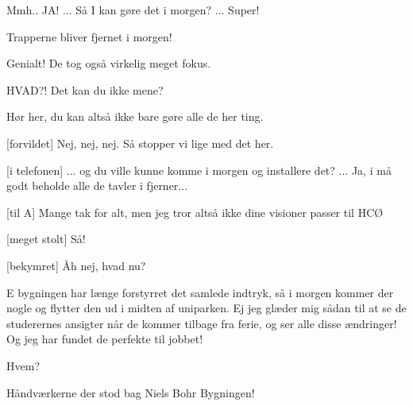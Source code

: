 \documentclass[a4paper,11pt]{article}
\begin{document}
\begin{sketch}

 Mmh.. JA! ... Så I kan gøre det i morgen? ... Super!


 Trapperne bliver fjernet i morgen!


 Genialt! De tog også virkelig meget fokus.

 HVAD?! Det kan du ikke mene? 


 Hør her, du kan altså ikke bare gøre alle de her ting.


[forvildet] Nej, nej, nej. Så stopper vi lige med det her.

[i telefonen] ... og du ville kunne komme i morgen og installere det? ... Ja, i må godt beholde alle de tavler i fjerner...


[til A] Mange tak for alt, men jeg tror altså ikke dine visioner passer til HCØ


[meget stolt] Så!

[bekymret] Åh nej, hvad nu?


 E bygningen har længe forstyrret det samlede indtryk, så i morgen kommer der nogle og flytter den ud i midten af uniparken. Ej jeg glæder mig sådan til at se de studerernes ansigter når de kommer tilbage fra ferie, og ser alle disse ændringer! Og jeg har fundet de perfekte til jobbet!  

 Hvem?

 Håndværkerne der stod bag Niels Bohr Bygningen!


\end{sketch}
\end{document}
